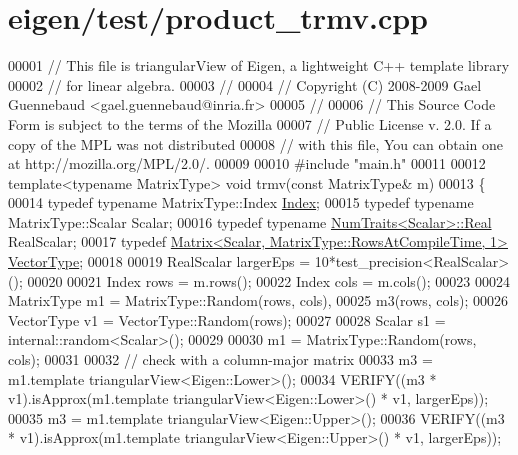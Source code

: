 \hypertarget{eigen_2test_2product__trmv_8cpp_source}{}\section{eigen/test/product\+\_\+trmv.cpp}
\label{eigen_2test_2product__trmv_8cpp_source}

\begin{DoxyCode}
00001 \textcolor{comment}{// This file is triangularView of Eigen, a lightweight C++ template library}
00002 \textcolor{comment}{// for linear algebra.}
00003 \textcolor{comment}{//}
00004 \textcolor{comment}{// Copyright (C) 2008-2009 Gael Guennebaud <gael.guennebaud@inria.fr>}
00005 \textcolor{comment}{//}
00006 \textcolor{comment}{// This Source Code Form is subject to the terms of the Mozilla}
00007 \textcolor{comment}{// Public License v. 2.0. If a copy of the MPL was not distributed}
00008 \textcolor{comment}{// with this file, You can obtain one at http://mozilla.org/MPL/2.0/.}
00009 
00010 \textcolor{preprocessor}{#include "main.h"}
00011 
00012 \textcolor{keyword}{template}<\textcolor{keyword}{typename} MatrixType> \textcolor{keywordtype}{void} trmv(\textcolor{keyword}{const} MatrixType& m)
00013 \{
00014   \textcolor{keyword}{typedef} \textcolor{keyword}{typename} MatrixType::Index \hyperlink{namespace_eigen_a62e77e0933482dafde8fe197d9a2cfde}{Index};
00015   \textcolor{keyword}{typedef} \textcolor{keyword}{typename} MatrixType::Scalar Scalar;
00016   \textcolor{keyword}{typedef} \textcolor{keyword}{typename} \hyperlink{group___core___module_struct_eigen_1_1_num_traits}{NumTraits<Scalar>::Real} RealScalar;
00017   \textcolor{keyword}{typedef} \hyperlink{group___core___module_class_eigen_1_1_matrix}{Matrix<Scalar, MatrixType::RowsAtCompileTime, 1>} 
      \hyperlink{struct_vector_type}{VectorType};
00018 
00019   RealScalar largerEps = 10*test\_precision<RealScalar>();
00020 
00021   Index rows = m.rows();
00022   Index cols = m.cols();
00023 
00024   MatrixType m1 = MatrixType::Random(rows, cols),
00025              m3(rows, cols);
00026   VectorType v1 = VectorType::Random(rows);
00027 
00028   Scalar s1 = internal::random<Scalar>();
00029 
00030   m1 = MatrixType::Random(rows, cols);
00031 
00032   \textcolor{comment}{// check with a column-major matrix}
00033   m3 = m1.template triangularView<Eigen::Lower>();
00034   VERIFY((m3 * v1).isApprox(m1.template triangularView<Eigen::Lower>() * v1, largerEps));
00035   m3 = m1.template triangularView<Eigen::Upper>();
00036   VERIFY((m3 * v1).isApprox(m1.template triangularView<Eigen::Upper>() * v1, largerEps));

\end{DoxyCode}

